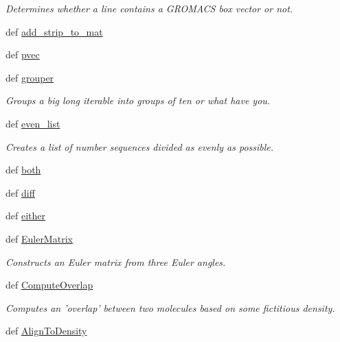 \begin{DoxyCompactItemize}
\begin{DoxyCompactList}\small\item\em \-Determines whether a line contains a \-G\-R\-O\-M\-A\-C\-S box vector or not. \end{DoxyCompactList}\item 
def \hyperlink{namespaceforcebalance_1_1molecule_a4cdb2086978b281ed84cd66179c3f5b2}{add\-\_\-strip\-\_\-to\-\_\-mat}
\item 
def \hyperlink{namespaceforcebalance_1_1molecule_a58c3f09152db4d1c6e1db9df29c60c43}{pvec}
\item 
def \hyperlink{namespaceforcebalance_1_1molecule_a7fe52c2928c7b0329882541bef2e34cd}{grouper}
\begin{DoxyCompactList}\small\item\em \-Groups a big long iterable into groups of ten or what have you. \end{DoxyCompactList}\item 
def \hyperlink{namespaceforcebalance_1_1molecule_a5f529179461765fadbd0a742cdc2c677}{even\-\_\-list}
\begin{DoxyCompactList}\small\item\em \-Creates a list of number sequences divided as evenly as possible. \end{DoxyCompactList}\item 
def \hyperlink{namespaceforcebalance_1_1molecule_a5b50df23cc4d0e617fdc56538f0bea63}{both}
\item 
def \hyperlink{namespaceforcebalance_1_1molecule_a6f7c6217b1c64da309a8abd21dfdcf08}{diff}
\item 
def \hyperlink{namespaceforcebalance_1_1molecule_a75775be6563ad7f10695a9a45ff49ba9}{either}
\item 
def \hyperlink{namespaceforcebalance_1_1molecule_af02bf73765f34bbef81c4a5b000b86ce}{\-Euler\-Matrix}
\begin{DoxyCompactList}\small\item\em \-Constructs an \-Euler matrix from three \-Euler angles. \end{DoxyCompactList}\item 
def \hyperlink{namespaceforcebalance_1_1molecule_a8fcbb4a2b3470a85d25699b6f28a54fc}{\-Compute\-Overlap}
\begin{DoxyCompactList}\small\item\em \-Computes an 'overlap' between two molecules based on some fictitious density. \end{DoxyCompactList}\item 
def \hyperlink{namespaceforcebalance_1_1molecule_a9a58eb1746e51420f50da3f3a6d51485}{\-Align\-To\-Density}

\end{DoxyCompactItemize}
